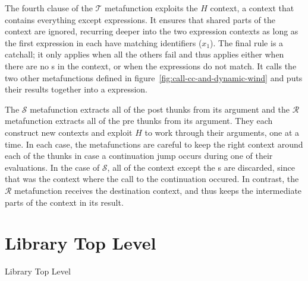 The fourth clause of the $\mathcal{T}$ metafunction exploits the
$H$ context, a context that contains everything except
 expressions. It ensures that shared parts of the
 context are ignored, recurring deeper into the
two expression contexts as long as the first  expression in
each have matching identifiers ($x_1$). The final rule is a
catchall; it only applies when all the others fail and thus applies
either when there are no s in the context, or when the
 expressions do not match. It calls the two other
metafunctions defined in figure~\ref{fig:call-cc-and-dynamic-wind} and
puts their results together into a  expression.

The $\mathcal{S}$ metafunction extracts all of the post thunks from
its argument and the $\mathcal{R}$ metafunction extracts all of the pre
thunks from its argument. They each construct new contexts and exploit
$H$ to work through their arguments, one  at a time.
In each case, the metafunctions are careful to keep the right
 context around each of the thunks in case a continuation
jump occurs during one of their evaluations. In the case of
$\mathcal{S}$, all of the context except the s are
discarded, since that was the context where the call to the
continuation occured. In contrast, the $\mathcal{R}$ metafunction
receives the destination context, and thus keeps the intermediate
parts of the context in its result.

\section{Library Top Level}

\beginfig
\begin{center}

\end{center}
\caption{Library Top Level}\label{fig:top-level-and-variables}
\endfig

